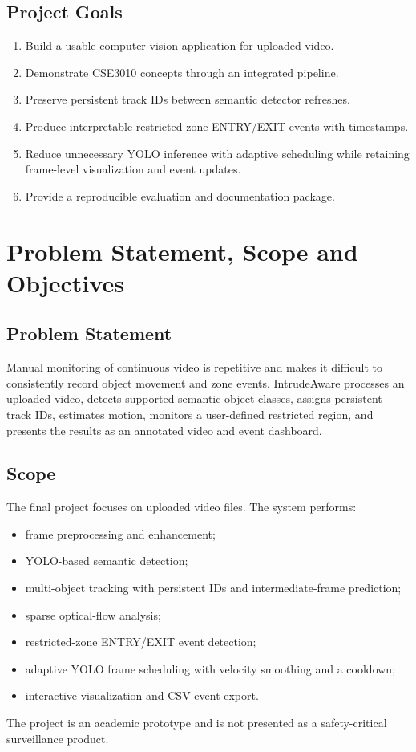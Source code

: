 \documentclass[12pt,a4paper]{report}
\begin{document}
\section{Project Goals}
\begin{enumerate}[leftmargin=*]
  \item Build a usable computer-vision application for uploaded video.
  \item Demonstrate CSE3010 concepts through an integrated pipeline.
  \item Preserve persistent track IDs between semantic detector refreshes.
  \item Produce interpretable restricted-zone ENTRY/EXIT events with timestamps.
  \item Reduce unnecessary YOLO inference with adaptive scheduling while retaining frame-level visualization and event updates.
  \item Provide a reproducible evaluation and documentation package.
\end{enumerate}

\chapter{Problem Statement, Scope and Objectives}
\section{Problem Statement}
Manual monitoring of continuous video is repetitive and makes it difficult to consistently record object movement and zone events. IntrudeAware processes an uploaded video, detects supported semantic object classes, assigns persistent track IDs, estimates motion, monitors a user-defined restricted region, and presents the results as an annotated video and event dashboard.

\section{Scope}
The final project focuses on uploaded video files. The system performs:
\begin{itemize}[leftmargin=*]
  \item frame preprocessing and enhancement;
  \item YOLO-based semantic detection;
  \item multi-object tracking with persistent IDs and intermediate-frame prediction;
  \item sparse optical-flow analysis;
  \item restricted-zone ENTRY/EXIT event detection;
  \item adaptive YOLO frame scheduling with velocity smoothing and a cooldown;
  \item interactive visualization and CSV event export.
\end{itemize}
The project is an academic prototype and is not presented as a safety-critical surveillance product.
\end{document}
